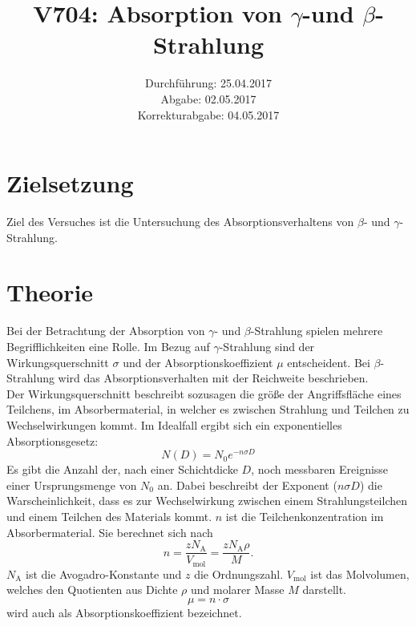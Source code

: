 \documentclass[
  bibliography=totoc,     %
  captions=tableheading,  %
  titlepage=firstiscover, %
]{scrartcl}
\title{V704: Absorption von \texorpdfstring{$\gamma$} --und \texorpdfstring{$\beta$} --Strahlung}
\author{
  Simon Schulte
  \texorpdfstring{
    \\
    \href{mailto:simon.schulte@udo.edu}{simon.schulte@udo.edu}
  }{}
  \texorpdfstring{\and}{, }
  Tim Sedlaczek
  \texorpdfstring{
    \\
    \href{mailto:tim.sedlaczek@udo.edu}{tim.sedlaczek@udo.edu}
  }{}
}
\date{Durchführung: 25.04.2017\\
      Abgabe: 02.05.2017\\
      Korrekturabgabe: 04.05.2017}
\begin{document}
\maketitle
\thispagestyle{empty}
\tableofcontents
\newpage
\setcounter{page}{1}
\section{Zielsetzung}
\label{sec:zielsetzung}
Ziel des Versuches ist die Untersuchung des Absorptionsverhaltens von $\beta$-
und $\gamma$-Strahlung.
\section{Theorie}
\label{sec:theorie}
Bei der Betrachtung der Absorption von $\gamma$- und $\beta$-Strahlung
spielen mehrere Begrifflichkeiten eine Rolle.
Im Bezug auf $\gamma$-Strahlung sind der Wirkungsquerschnitt $\sigma$ und
der Absorptionskoeffizient $\mu$ entscheident.
Bei $\beta$-Strahlung wird das Absorptionsverhalten mit der Reichweite
beschrieben.\\

\noindent
Der Wirkungsquerschnitt beschreibt sozusagen die größe der Angriffsfläche
eines Teilchens, im Absorbermaterial, in welcher es zwischen Strahlung
und Teilchen zu Wechselwirkungen kommt.
Im Idealfall ergibt sich ein exponentielles Absorptionsgesetz:
\begin{equation}
  N \left( D \right) = N_0 e^{-n \sigma D}
  \label{eqn:absorption}
\end{equation}
Es gibt die Anzahl der, nach einer Schichtdicke $D$, noch messbaren Ereignisse
einer Ursprungsmenge von $N_0$ an.
Dabei beschreibt der Exponent ($n \sigma D$) die Warscheinlichkeit, dass
es zur Wechselwirkung zwischen einem Strahlungsteilchen und einem Teilchen
des Materials kommt. $n$ ist die Teilchenkonzentration im Absorbermaterial.
Sie berechnet sich nach
\begin{equation}
  n = \frac{z N_\mathup{A}}{V_\mathup{mol}} = \frac{z N_\mathup{A} \rho}{M}.
  \label{eqn:teilchenkonz}
\end{equation}
$N_\mathup{A}$ ist die Avogadro-Konstante und $z$ die Ordnungszahl.
$V_\mathup{mol}$ ist das Molvolumen, welches den Quotienten aus Dichte
$\rho$ und molarer Masse $M$ darstellt.
\begin{equation}
  \mu = n \cdot \sigma
  \label{eqn:mu_theo}
\end{equation}
wird auch als Absorptionskoeffizient bezeichnet.
\end{document}
